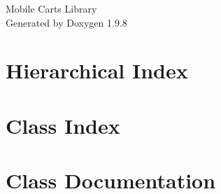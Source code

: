 \documentclass[twoside]{book}
\newcommand{\+}{\discretionary{\mbox{\scriptsize$\hookleftarrow$}}{}{}}
\newcommand{\clearemptydoublepage}{%
    \newpage{\pagestyle{empty}\cleardoublepage}%
  }
\begin{document}
  \raggedbottom
    \hypersetup{pageanchor=false,
                bookmarksnumbered=true,
                pdfencoding=unicode
               }
  \begin{titlepage}
  \vspace*{7cm}
  \begin{center}%
  {\Large Mobile Carts Library}\\
  \vspace*{1cm}
  {\large Generated by Doxygen 1.9.8}\\
  \end{center}
  \end{titlepage}
  \clearemptydoublepage
  \tableofcontents
  \clearemptydoublepage
  \hypersetup{pageanchor=true}
\chapter{Hierarchical Index}

\chapter{Class Index}

\chapter{Class Documentation}








  \backmatter
  \newpage
  \clearemptydoublepage
  \printindex
\end{document}

